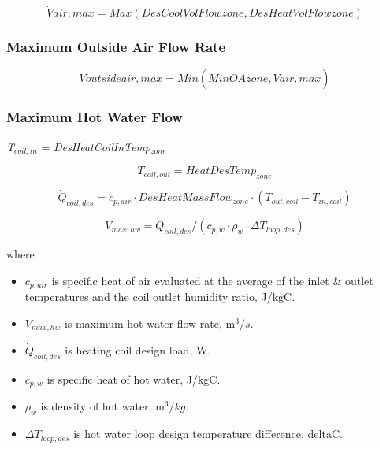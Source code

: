 \begin{equation}
\dot Vair,max = Max(DesCoolVolFlowzone,DesHeatVolFlowzone)
\end{equation}

\subsubsection{Maximum Outside Air Flow Rate}\label{maximum-outside-air-flow-rate}

\begin{equation}
\dot Voutsideair,max = Min(MinOAzone,\dot Vair,max)
\end{equation}

\subsubsection{Maximum Hot Water Flow}\label{maximum-hot-water-flow}

\emph{T\(_{coil,in}\)} = \emph{DesHeatCoilInTemp\(_{zone}\)}

\begin{equation}
  T_{coil,out} = HeatDesTemp_{zone}
\end{equation}

\begin{equation}
  \dot{Q}_{coil,des} = c_{p,air} \cdot DesHeatMassFlow_{zone} \cdot (T_{out,coil} - T_{in,coil})
\end{equation}

\begin{equation}
  \dot{V}_{max,hw} = \dot{Q}_{coil,des} / (c_{p,w} \cdot \rho_{w} \cdot \Delta T_{loop,des})
\end{equation}

where

\begin{itemize}
\tightlist
\item
  \(c_{p,air}\) is specific heat of air evaluated at the average of the inlet \& outlet temperatures and the coil outlet humidity ratio, J/kgC.
\item
  \(\dot{V}_{max,hw}\) is maximum hot water flow rate, m$^{3}/s$.
\item
  \(\dot{Q}_{coil,des}\) is heating coil design load, W.
\item
  \(c_{p,w}\) is specific heat of hot water, J/kgC.
\item
  \(\rho_{w}\) is density of hot water, m$^{3}/kg$.
\item
  \(\Delta T_{loop,des}\) is hot water loop design temperature difference, deltaC.
\end{itemize}

